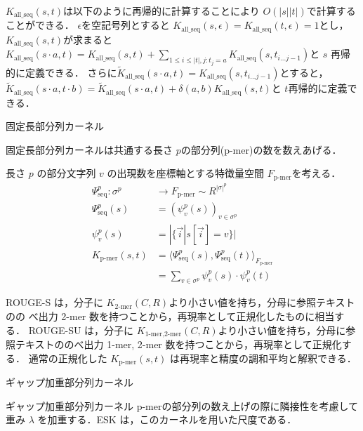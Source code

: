 \documentclass[japanese]{jnlp_1.4}
\renewcommand{\paragraph}{}
\newcommand{\modified}[1]{}
\begin{document}
$K_{\mbox{all\_seq}}(s,t)$は以下のように再帰的に計算することにより $O(|s||t|)$で計算することができる．
$\epsilon$を空記号列とすると
$K_{\mbox{all\_seq}}(s,\epsilon) = K_{\mbox{all\_seq}}(t,\epsilon) = 1$とし，
$K_{\mbox{all\_seq}}(s,t) $が求まると
$K_{\mbox{all\_seq}}(s \cdot a,t) = K_{\mbox{all\_seq}}(s,t) + \sum_{1\leq i \leq |t|, j:t_{j}=a} K_{\mbox{all\_seq}}(s,t_{i \ldots j-1}) $と $s$ 再帰的に定義できる．
さらに$\tilde{K}_{\mbox{all\_seq}}(s \cdot a,t) = K_{\mbox{all\_seq}}(s,t_{i \ldots j-1})$とすると，$\tilde{K}_{\mbox{all\_seq}}(s \cdot a,t \cdot b) = \tilde{K}_{\mbox{all\_seq}}(s \cdot a,t) + \delta(a,b) K_{\mbox{all\_seq}}(s,t)$と $t$再帰的に定義できる．


\paragraph{固定長部分列カーネル}
\label{para:p-mer-k}

固定長部分列カーネルは共通する長さ $p$の部分列(p-mer)の数を数えあげる．

長さ $p$ の部分文字列 $v$ の出現数を座標軸とする特徴量空間 $F_{\mbox{p-mer}}$を考える．
\begin{align*}
\Psi^{p}_{\mbox{seq}}: \sigma^{p} & \rightarrow  F_{\mbox{p-mer}} \sim R^{|\sigma|^{p}} \\
\Psi^{p}_{\mbox{seq}}(s) & =  (\psi^{p}_{v}(s))_{v \in \sigma^{p}} \\
\psi^{p}_{v}(s) & =  |\{\vec{i}|s[\vec{i}]=v\}| \\
K_{\mbox{p-mer}}(s,t)  & =  \langle \Psi^{p}_{\mbox{seq}} (s), \Psi^{p}_{\mbox{seq}} (t) \rangle_{F_{\mbox{p-mer}}} \\
& =  \sum_{v \in \sigma^{p}} \psi^{p}_{v}(s) \cdot \psi^{p}_{v}(t) 
\end{align*}

ROUGE-S は，分子に $K_{\mbox{2-mer}}(C,R)$より小さい値を持ち，分母に参照テキストのの
べ出力 2-mer 数を持つことから，再現率として正規化したものに相当する．
ROUGE-SU は，分子に $K_{\mbox{1-mer,2-mer}}(C,R)$より小さい値を持ち，分母に参照テキストののべ出力 1-mer, 2-mer 数を持つことから，再現率として正規化する．
通常の正規化した $K_{\mbox{p-mer}}(s,t)$ は再現率と精度の調和平均と解釈できる．


\paragraph{ギャップ加重部分列カーネル}
\label{para:gap-p-mer-k}

ギャップ加重部分列カーネル\modified{は} p-merの部分列の数え上げの際に隣接性を考慮して重み
$\lambda$ を加重する．ESK \cite{hirao-2006-IPSJ-journal}は，このカーネルを用いた尺度である．
\end{document}
